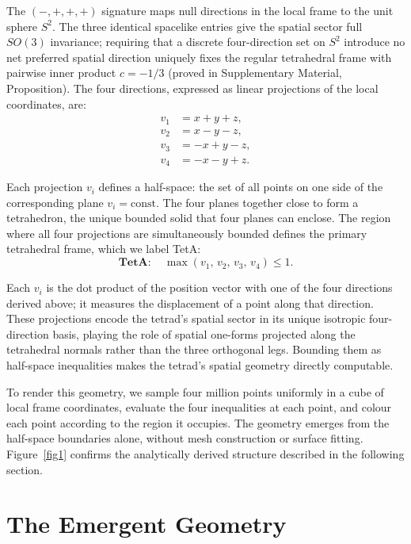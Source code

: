 \documentclass[twocolumn]{iopjournal}
\begin{document}
The $(-,+,+,+)$ signature maps null directions in the local frame to
the unit sphere $S^2$. The three identical spacelike entries give the
spatial sector full $SO(3)$ invariance; requiring that a discrete
four-direction set on $S^2$ introduce no net preferred spatial direction
uniquely fixes the regular tetrahedral frame with pairwise inner product
$c = -1/3$ (proved in Supplementary Material, Proposition). The four directions,
expressed as linear projections of the local coordinates, are:
\begin{align}
v_1 &= x + y + z, \nonumber \\
v_2 &= x - y - z, \nonumber \\
v_3 &= -x + y - z, \nonumber \\
v_4 &= -x - y + z.
\end{align}

Each projection $v_i$ defines a half-space: the set of all points on one side of the corresponding plane $v_i = \mathrm{const}$. The four planes together close to form a tetrahedron, the unique bounded solid that four planes can enclose. The region where all four projections are simultaneously bounded defines the primary tetrahedral frame, which we label TetA:
\begin{equation}
\textbf{TetA}: \quad \max(v_1,\, v_2,\, v_3,\, v_4) \leq 1.
\end{equation}

Each $v_i$ is the dot product of the position vector with one of the four directions derived above; it measures the displacement of a point along that direction. These projections encode the tetrad's spatial sector in its unique isotropic four-direction basis, playing the role of spatial one-forms projected along the tetrahedral normals rather than the three orthogonal legs. Bounding them as half-space inequalities makes the tetrad's spatial geometry directly computable.

To render this geometry, we sample four million points uniformly in a cube of local frame coordinates, evaluate the four inequalities at each point, and colour each point according to the region it occupies. The geometry emerges from the half-space boundaries alone, without mesh construction or surface fitting. Figure~\ref{fig1} confirms the analytically derived structure described in the following section.


\section*{The Emergent Geometry}
\end{document}
